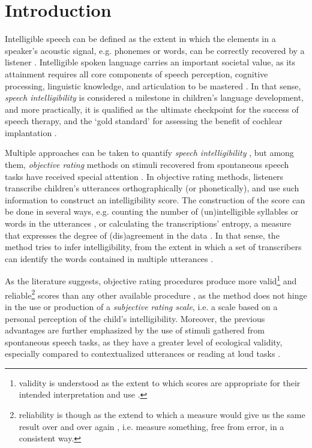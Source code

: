 \section{Introduction} \label{S:introduction}

Intelligible speech can be defined as the extent in which the elements in a speaker's acoustic signal, e.g. phonemes or words, can be correctly recovered by a listener \citep{Freeman_et_al_2017, Kent_et_al_1989, vanHeuven_2008, Whitehill_et_al_2004}. Intelligible spoken language carries an important societal value, as its attainment requires all core components of speech perception, cognitive processing, linguistic knowledge, and articulation to be mastered \citep{Freeman_et_al_2017}. In that sense, \textit{speech intelligibility} is considered a milestone in children's language development, and more practically, it is qualified as the ultimate checkpoint for the success of speech therapy, and the `gold standard' for assessing the benefit of cochlear implantation \citep{Chin_et_al_2012}. 

Multiple approaches can be taken to quantify \textit{speech intelligibility} \citep{Boonen_et_al_2020, Boonen_et_al_2021, Flipsen_2006, Hustad_et_al_2020}, but among them, \textit{objective rating} methods on stimuli recovered from spontaneous speech tasks have received special attention \citep{Boonen_et_al_2021, Hustad_et_al_2020}. In objective rating methods, listeners transcribe children's utterances orthographically (or phonetically), and use such information to construct an intelligibility score. The construction of the score can be done in several ways, e.g. counting the number of (un)intelligible syllables or words in the utterances \citep{Flipsen_2006, Lagerberg_et_al_2014}, or calculating the transcriptions' entropy, a measure that expresses the degree of (dis)agreement in the data \citep{Boonen_et_al_2021, Shannon_1948}. In that sense, the method tries to infer intelligibility, from the extent in which a set of transcribers can identify the words contained in multiple utterances \cite{Boonen_et_al_2021}. 

As the literature suggests, objective rating procedures produce more valid\footnote{validity is understood as the extent to which scores are appropriate for their intended interpretation and use \citep{Lesterhuis_2018, Trochim_2022}.} and reliable\footnote{reliability is though as the extend to which a measure would give us the same result over and over again \citep{Trochim_2022}, i.e. measure something, free from error, in a consistent way.} scores than any other available procedure \citep{Boonen_et_al_2021, Faes_et_al_2021}, as the method does not hinge in the use or production of a \textit{subjective rating scale}, i.e. a scale based on a personal perception of the child's intelligibility. Moreover, the previous advantages are further emphasized by the use of stimuli gathered from spontaneous speech tasks, as they have a greater level of ecological validity, especially compared to contextualized utterances or reading at loud tasks \cite{Flipsen_2006, Ertmer_2011}.

